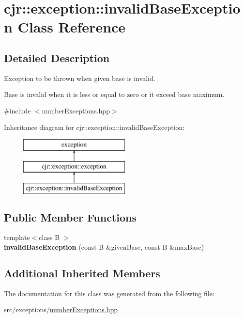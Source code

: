 \hypertarget{classcjr_1_1exception_1_1invalid_base_exception}{\section{cjr\-:\-:exception\-:\-:invalid\-Base\-Exception Class Reference}
\label{classcjr_1_1exception_1_1invalid_base_exception}
}


\subsection{Detailed Description}
Exception to be thrown when given base is invalid. 

Base is invalid when it is less or equal to zero or it exceed base maximum. 

{\ttfamily \#include $<$number\-Exceptions.\-hpp$>$}

Inheritance diagram for cjr\-:\-:exception\-:\-:invalid\-Base\-Exception\-:\begin{figure}[H]
\begin{center}
\leavevmode
\includegraphics[height=3.000000cm]{classcjr_1_1exception_1_1invalid_base_exception}
\end{center}
\end{figure}
\subsection*{Public Member Functions}
\begin{DoxyCompactItemize}
\item 
\hypertarget{classcjr_1_1exception_1_1invalid_base_exception_a1642100156f3313b9f762a1fff75588c}{{\footnotesize template$<$class B $>$ }\\{\bfseries invalid\-Base\-Exception} (const B \&given\-Base, const B \&max\-Base)}\label{classcjr_1_1exception_1_1invalid_base_exception_a1642100156f3313b9f762a1fff75588c}

\end{DoxyCompactItemize}
\subsection*{Additional Inherited Members}


The documentation for this class was generated from the following file\-:\begin{DoxyCompactItemize}
\item 
src/exceptions/\hyperlink{number_exceptions_8hpp}{number\-Exceptions.\-hpp}\end{DoxyCompactItemize}
